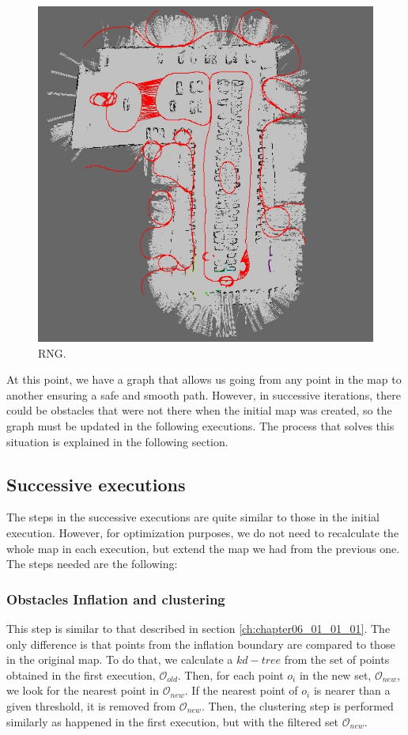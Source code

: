 \begin{figure}[h!]
  \centering
  \includegraphics[width=\textwidth, height=0.75\textwidth]{figure4}
  \caption{\acf{RNG}.}
  \label{fig:cp06_rng}
\end{figure}%

At this point, we have a graph that allows us going from any point in the map to another ensuring a safe and smooth path. However, in successive iterations, there could be obstacles that were not there when the initial map was created, so the graph must be updated in the following executions. The process that solves this situation is explained in the following section.

\subsection{Successive executions}\label{ch:chapter06_01_02}

The steps in the successive executions are quite similar to those in the initial execution. However, for optimization purposes, we do not need to recalculate the whole map in each execution, but extend the map we had from the previous one. The steps needed are the following:

\subsubsection{Obstacles Inflation and clustering}\label{ch:chapter06_01_02_01}

This step is similar to that described in section \ref{ch:chapter06_01_01_01}. The only difference is that points from the inflation boundary are compared to those in the original map. To do that, we calculate a $kd-tree$ from the set of points obtained in the first execution, $\mathcal{O}_{old}$. Then, for each point $o_i$ in the new set, $\mathcal{O}_{new}$, we look for the nearest point in $\mathcal{O}_{new}$. If the nearest point of $o_i$ is nearer than a given threshold, it is removed from $\mathcal{O}_{new}$. Then, the clustering step is performed similarly as happened in the first execution, but with the filtered set $\mathcal{O}_{new}$.

